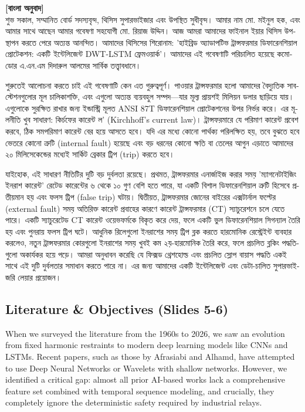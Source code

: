 \documentclass[12pt]{article}
\begin{document}
\begin{bengali}
\textbf{[বাংলা অনুবাদ]} \\
শুভ সকাল, সম্মানিত বোর্ড সদস্যবৃন্দ, থিসিস সুপারভাইজার এবং উপস্থিত সুধীবৃন্দ। আমার নাম মো. মইনুল হক, এবং আমার সাথে আছেন আমার গবেষণা সহযোগী মো. রিয়াজ উদ্দিন। আজ আমরা আমাদের ফাইনাল ইয়ার থিসিস উপস্থাপন করতে পেরে অত্যন্ত আনন্দিত। আমাদের থিসিসের শিরোনাম: 'হাইব্রিড অ্যাডাপটিভ ট্রান্সফরমার ডিফারেনশিয়াল প্রোটেকশন: একটি ইন্টেলিজেন্ট DWT-LSTM ফ্রেমওয়ার্ক'। আমাদের এই গবেষণাটি পরিচালিত হয়েছে কমোডোর এ.এন.এম দিদারুল আলমের সার্বিক তত্ত্বাবধানে।

শুরুতেই আলোচনা করতে চাই এই গবেষণাটি কেন এত গুরুত্বপূর্ণ। পাওয়ার ট্রান্সফরমার হলো আমাদের বৈদ্যুতিক সাবস্টেশনগুলোর মূল চালিকাশক্তি, এবং এগুলো অত্যন্ত ব্যয়বহুল সম্পদ—যার মূল্য প্রায়শই মিলিয়ন ডলার ছাড়িয়ে যায়। এগুলোকে সুরক্ষিত রাখার জন্য ইন্ডাস্ট্রি মূলত ANSI 87T ডিফারেনশিয়াল প্রোটেকশনের উপর নির্ভর করে। এর মূলনীতি খুব সাধারণ: কির্চফের কারেন্ট ল' (Kirchhoff's current law)। ট্রান্সফরমারে যে পরিমাণ কারেন্ট প্রবেশ করবে, ঠিক সমপরিমাণ কারেন্ট বের হয়ে আসতে হবে। যদি এর মধ্যে কোনো পার্থক্য পরিলক্ষিত হয়, তবে বুঝতে হবে ভেতরে কোনো ত্রুটি (internal fault) হয়েছে এবং বড় ধরনের কোনো ক্ষতি বা তেলের আগুন এড়াতে আমাদের ২০ মিলিসেকেন্ডের মধ্যেই সার্কিট ব্রেকার ট্রিপ (trip) করতে হবে।

যাইহোক, এই সাধারণ নীতিটির দুটি বড় দুর্বলতা রয়েছে। প্রথমত, ট্রান্সফরমার এনার্জাইজ করার সময় 'ম্যাগনেটাইজিং ইনরাশ কারেন্ট' রেটেড কারেন্টের ৬ থেকে ১০ গুণ বেশি হতে পারে, যা একটি বিশাল ডিফারেনশিয়াল ত্রুটি হিসেবে প্রতীয়মান হয় এবং ফলস ট্রিপ (false trip) ঘটায়। দ্বিতীয়ত, ট্রান্সফরমার জোনের বাইরের এক্সটার্নাল ফল্টের (external fault) সময় অতিরিক্ত কারেন্ট প্রবাহের কারণে কারেন্ট ট্রান্সফরমার (CT) স্যাচুরেশনে চলে যেতে পারে। একটি স্যাচুরেটেড CT কারেন্ট ওয়েভফর্মকে বিকৃত করে দেয়, ফলে একটি ভুল ডিফারেনশিয়াল সিগন্যাল তৈরি হয় এবং পুনরায় ফলস ট্রিপ ঘটে। আধুনিক রিলেগুলো ইনরাশের সময় ট্রিপ ব্লক করতে হারমোনিক রেস্ট্রেইন্ট ব্যবহার করলেও, নতুন ট্রান্সফরমার কোরগুলো ইনরাশের সময় খুবই কম ২য়-হারমোনিক তৈরি করে, ফলে প্রচলিত ব্লকিং পদ্ধতিগুলো অকার্যকর হয়ে পড়ে। আমরা অনুধাবন করেছি যে ফিক্সড থ্রেশহোল্ড এবং প্রচলিত স্লোপ বায়াস পদ্ধতি একই সাথে এই দুটি দুর্বলতার সমাধান করতে পারে না। এর জন্য আমাদের একটি ইন্টেলিজেন্ট এবং ডেটা-চালিত সুপারভাইজরি লেয়ার প্রয়োজন।
\end{bengali}

\subsection*{Literature \& Objectives (Slides 5-6)}
When we surveyed the literature from the 1960s to 2026, we saw an evolution from fixed harmonic restraints to modern deep learning models like CNNs and LSTMs. Recent papers, such as those by Afrasiabi and Alhamd, have attempted to use Deep Neural Networks or Wavelets with shallow networks. However, we identified a critical gap: almost all prior AI-based works lack a comprehensive feature set combined with temporal sequence modeling, and crucially, they completely ignore the deterministic safety required by industrial relays.
\end{document}
